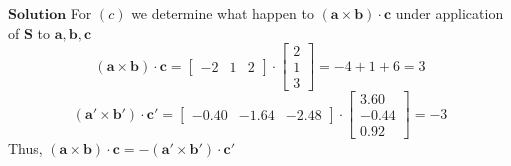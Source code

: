 \documentclass{article}
\begin{document}
\begin{flushleft}
$\boxed{\textbf{Solution}}$ For $(c)
$ we determine what happen to $(\mathbf{a} \times \mathbf{b}) \cdot \mathbf{c}$ under application of $\mathbf{S}$ to $\mathbf{a}, \mathbf{b}, \mathbf{c}$
$$
(\mathbf{a} \times \mathbf{b}) \cdot \mathbf{c}=\begin{bmatrix}
-2 & 1 & 2
\end{bmatrix} \cdot\begin{bmatrix}
2 \\
1 \\
3
\end{bmatrix}=-4+1+6=3
$$
$$
\left(\mathbf{a}' \times \mathbf{b}'\right) \cdot \mathbf{c}'=\begin{bmatrix}
-0.40 & -1.64 & -2.48
\end{bmatrix} \cdot\begin{bmatrix}
3.60 \\
-0.44 \\
0.92
\end{bmatrix}=-3
$$
Thus, $(\mathbf{a} \times \mathbf{b}) \cdot \mathbf{c}=-\left(\mathbf{a}' \times \mathbf{b}'\right) \cdot \mathbf{c}'$





\end{flushleft}
\end{document}
